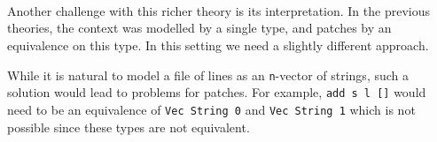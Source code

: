 \begin{code}[hide]
\>[2]\AgdaSymbol{(}\AgdaSpace{}%
\AgdaSpace{}%
\AgdaSpace{}%
\AgdaBound{\AgdaUnderscore{}}\AgdaSpace{}%
\AgdaSpace{}%
\AgdaSymbol{)}\AgdaSpace{}%
\AgdaSpace{}%
\AgdaSpace{}%
\AgdaSpace{}%
\AgdaSpace{}%
\AgdaSpace{}%
\AgdaSymbol{(}\AgdaSpace{}%
\AgdaSymbol{)}\AgdaSpace{}%
\AgdaSymbol{)}\AgdaSpace{}%
\AgdaSymbol{)}\<%
\\
%
\\[\AgdaEmptyExtraSkip]%
\>[0]\AgdaSpace{}%
\AgdaSymbol{:}\AgdaSpace{}%
\AgdaSymbol{\{}\AgdaSpace{}%
\AgdaSpace{}%
\AgdaSymbol{:}\AgdaSpace{}%
\AgdaSymbol{\}}\AgdaSpace{}%
\AgdaSymbol{\{}\AgdaSpace{}%
\AgdaSymbol{:}\AgdaSpace{}%
\AgdaSymbol{\}}\AgdaSpace{}%
\AgdaSymbol{\{}\AgdaSpace{}%
\AgdaSymbol{:}\AgdaSpace{}%
\AgdaSymbol{\}}\AgdaSpace{}%
\AgdaSpace{}%
\AgdaSymbol{(}\AgdaSpace{}%
\AgdaSpace{}%
\AgdaSpace{}%
\AgdaSpace{}%
\AgdaSymbol{)}\AgdaSpace{}%
\AgdaSpace{}%
\AgdaSpace{}%
\AgdaSpace{}%
\AgdaSpace{}%
\AgdaSpace{}%
\<%
\\
\>[0]\AgdaSpace{}%
\AgdaSymbol{\{}\AgdaSpace{}%
\AgdaSymbol{=}\AgdaSpace{}%
\AgdaSymbol{\}}\AgdaSpace{}%
\AgdaSymbol{\{}\AgdaSpace{}%
\AgdaSymbol{=}\AgdaSpace{}%
\AgdaSymbol{\}}\AgdaSpace{}%
\AgdaSpace{}%
\AgdaSymbol{=}\AgdaSpace{}%
\AgdaSpace{}%
\AgdaSpace{}%
\AgdaSymbol{(}\AgdaSpace{}%
\AgdaSymbol{)}\AgdaSpace{}%
\AgdaSymbol{(}\AgdaSpace{}%
\AgdaSymbol{)}\<%
\end{code}

Another challenge with this richer theory is its interpretation. In the previous theories,
the context was modelled by a single type, and patches by an equivalence on this type.
In this setting we need a slightly different approach.

While it is natural to model a file of  lines as an \texttt{n}-vector of strings,
such a solution would lead to problems for patches. For example, \texttt{add s l []} would need
to be an equivalence of \texttt{Vec String 0} and \texttt{Vec String 1} which is not possible
since these types are not equivalent.


